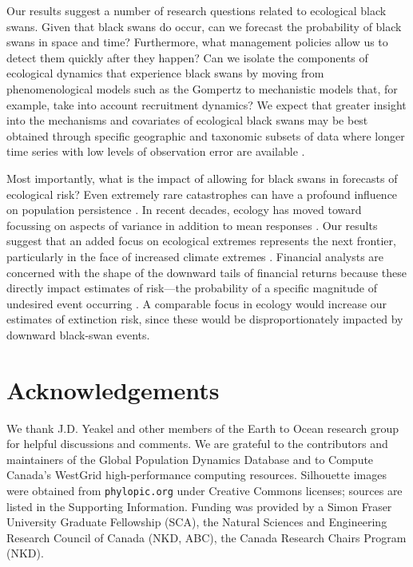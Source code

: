 Our results suggest a number of research questions related to ecological black
swans. Given that black swans do occur, can we forecast the probability of
black swans in space and time? Furthermore, what management policies allow us
to detect them quickly after they happen? Can we isolate the components of
ecological dynamics that experience black swans by moving from
phenomenological models such as the Gompertz to mechanistic models that, for
example, take into account recruitment dynamics? We expect that greater
insight into the mechanisms and covariates of ecological black swans may be
best obtained through specific geographic and taxonomic subsets of data where
longer time series with low levels of observation error are available
\citep[e.g.][]{segura2013}.

Most importantly, what is the impact of allowing for black swans in forecasts
of ecological risk? Even extremely rare catastrophes can have a profound
influence on population persistence \citep{mangel1994}. In recent decades,
ecology has moved toward focussing on aspects of variance in addition to mean
responses \citep[e.g.][]{loreau2010a, thompson2013}. Our results suggest that
an added focus on ecological extremes represents the next frontier,
particularly in the face of increased climate extremes \citep{meehl2004,
  thompson2013, ipcc2012}. Financial analysts are concerned with the shape of
the downward tails of financial returns because these directly impact
estimates of risk---the probability of a specific magnitude of undesired event
occurring \citep{rachev2008}. A comparable focus in ecology would increase our
estimates of extinction risk, since these would be disproportionately impacted
by downward black-swan events.

\section{Acknowledgements}

We thank J.D. Yeakel and other members of the Earth to Ocean research
group for helpful discussions and comments. We are grateful to the
contributors and maintainers of the Global Population Dynamics Database and to
Compute Canada's WestGrid high-performance computing resources. Silhouette
images were obtained from \texttt{phylopic.org} under Creative Commons
licenses; sources are listed in the Supporting Information. Funding was
provided by a Simon Fraser University Graduate Fellowship (SCA), the Natural
Sciences and Engineering Research Council of Canada (NKD, ABC), the Canada
Research Chairs Program (NKD).

